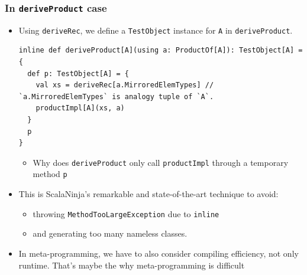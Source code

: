 \begin{frame}[fragile]
  \frametitle{ In \lstinline|deriveProduct| case}
  
  \begin{itemize}
    \item<+-> Using \lstinline|deriveRec|, we define a \lstinline|TestObject| instance for \lstinline|A|
    in \lstinline|deriveProduct|.
\begin{lstlisting}[style=scala]
inline def deriveProduct[A](using a: ProductOf[A]): TestObject[A] = {
  def p: TestObject[A] = {
    val xs = deriveRec[a.MirroredElemTypes] // `a.MirroredElemTypes` is analogy tuple of `A`.
    productImpl[A](xs, a)
  }
  p
}
\end{lstlisting}
    \begin{itemize}
      \item Why does \lstinline|deriveProduct| only call \lstinline|productImpl|
      through a temporary method \lstinline|p|
    \end{itemize}

    \item<+-> This is ScalaNinja's remarkable and state-of-the-art technique to avoid:
    \begin{itemize}
      \item throwing \lstinline|MethodTooLargeException| due to \lstinline|inline|
      \item and generating too many nameless classes.
    \end{itemize}

    \item<+-> In meta-programming, we have to also consider compiling efficiency, not only runtime.
    That's maybe the why meta-programming is difficult
  \end{itemize}

\end{frame}

